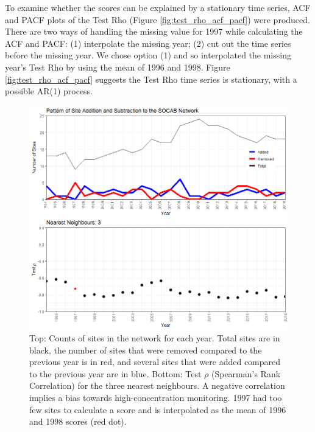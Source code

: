 \documentclass{article}
\begin{document}
To examine whether the scores can be explained by a stationary time series, ACF and PACF plots of the Test Rho (Figure \ref{fig:test_rho_acf_pacf}) were produced.  There are two ways of handling the missing value for 1997 while calculating the ACF and PACF:  (1) interpolate the missing year; (2) cut out the time series before the missing year.  We chose option (1) and so interpolated the missing year's Test Rho by using the mean of 1996 and 1998.  Figure \ref{fig:test_rho_acf_pacf} suggests the Test Rho time series is stationary, with a possible AR(1) process.  

\begin{figure}
	\centering
	\includegraphics[width = 
	\textwidth]{Figures/PreferentialSampling/PrefSmpl_nonn3combine_siteCounts_TestRho.png}
	\caption{Top:  Counts of sites in the network for each year.  Total sites are in black, the number of sites that were removed compared to the previous year is in red, and several sites that were added compared to the previous year are in blue. 
		Bottom: Test $\rho$ (Spearman's Rank Correlation) for the three nearest neighbours.  A negative correlation implies a bias towards high-concentration monitoring. 1997 had too few sites to calculate a score and is interpolated as the mean of 1996 and 1998 scores (red dot).}
\label{fig:PS_site_counts_test_rho}
\end{figure}
\end{document}
